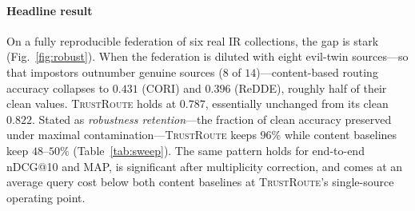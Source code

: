 \documentclass[preprint,12pt]{elsarticle}
\newcommand{\system}{\textsc{TrustRoute}}
\begin{document}
\paragraph*{Headline result}
On a fully reproducible federation of six real IR collections, the gap is stark
(Fig.~\ref{fig:robust}). When the federation is diluted with eight evil-twin
sources---so that impostors outnumber genuine sources ($8$ of $14$)---content-based
routing accuracy collapses to $0.431$ (CORI) and $0.396$ (ReDDE), roughly half of
their clean values. \system{} holds at $0.787$, essentially unchanged from its
clean $0.822$. Stated as \emph{robustness retention}---the fraction of clean
accuracy preserved under maximal contamination---\system{} keeps $96\%$ while
content baselines keep $48$--$50\%$ (Table~\ref{tab:sweep}). The same pattern
holds for end-to-end nDCG@10 and MAP, is significant after multiplicity
correction, and comes at an average query cost below both content baselines at
\system's single-source operating point.
\end{document}
